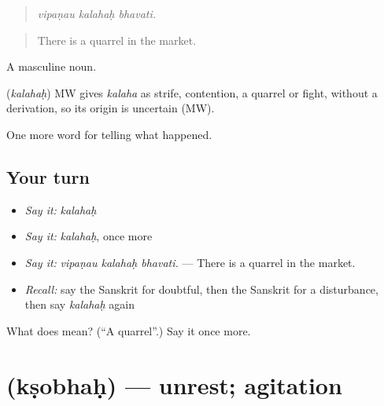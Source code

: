 \begin{quote}
  
\end{quote}

\begin{quote}
\emph{vipaṇau kalahaḥ bhavati.}
\end{quote}

\begin{quote}
There is a quarrel in the market.
\end{quote}

A masculine noun.

\begin{cousinweb}
\textbf{} (\emph{kalahaḥ}) MW gives \emph{kalaha} as strife, contention, a quarrel or fight, without a derivation, so its origin is uncertain (MW).
\end{cousinweb}

\begin{grammarlens}[title={What you've built}]
One more word for telling what happened.
\end{grammarlens}

\subsection*{Your turn}
\begin{itemize}
\raggedright
  \item \emph{Say it:} \emph{kalahaḥ}
  \item \emph{Say it:} \emph{kalahaḥ}, once more
  \item \emph{Say it:} \emph{vipaṇau kalahaḥ bhavati.} — There is a quarrel in the market.
  \item \emph{Recall:} say the Sanskrit for doubtful, then the Sanskrit for a disturbance, then say \emph{kalahaḥ} again
\end{itemize}

\begin{tcolorbox}[breakable,colback=teal!4,colframe=teal!35!black,title={Before you move on}]
What does  mean? (\textquotedblleft{}A quarrel\textquotedblright{}.) Say it once more.
\end{tcolorbox}
\section[\texorpdfstring{\sk{क्षोभः} (kṣobhaḥ)}{क्षोभः (kṣobhaḥ)}]{ (kṣobhaḥ) — unrest; agitation}

\label{lesson:SA-C313-ksobhah}



